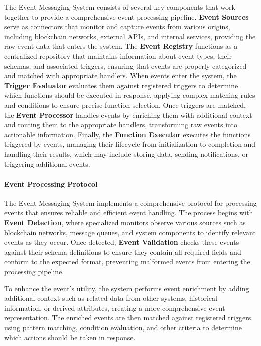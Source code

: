 \documentclass[11pt]{article}
\begin{document}
The Event Messaging System consists of several key components that work together to provide a comprehensive event processing pipeline. \textbf{Event Sources} serve as connectors that monitor and capture events from various origins, including blockchain networks, external APIs, and internal services, providing the raw event data that enters the system. The \textbf{Event Registry} functions as a centralized repository that maintains information about event types, their schemas, and associated triggers, ensuring that events are properly categorized and matched with appropriate handlers. When events enter the system, the \textbf{Trigger Evaluator} evaluates them against registered triggers to determine which functions should be executed in response, applying complex matching rules and conditions to ensure precise function selection. Once triggers are matched, the \textbf{Event Processor} handles events by enriching them with additional context and routing them to the appropriate handlers, transforming raw events into actionable information. Finally, the \textbf{Function Executor} executes the functions triggered by events, managing their lifecycle from initialization to completion and handling their results, which may include storing data, sending notifications, or triggering additional events.

\paragraph{Event Processing Protocol}
The Event Messaging System implements a comprehensive protocol for processing events that ensures reliable and efficient event handling. The process begins with \textbf{Event Detection}, where specialized monitors observe various sources such as blockchain networks, message queues, and system components to identify relevant events as they occur. Once detected, \textbf{Event Validation} checks these events against their schema definitions to ensure they contain all required fields and conform to the expected format, preventing malformed events from entering the processing pipeline.

To enhance the event's utility, the system performs event enrichment by adding additional context such as related data from other systems, historical information, or derived attributes, creating a more comprehensive event representation. The enriched events are then matched against registered triggers using pattern matching, condition evaluation, and other criteria to determine which actions should be taken in response.
\end{document}
